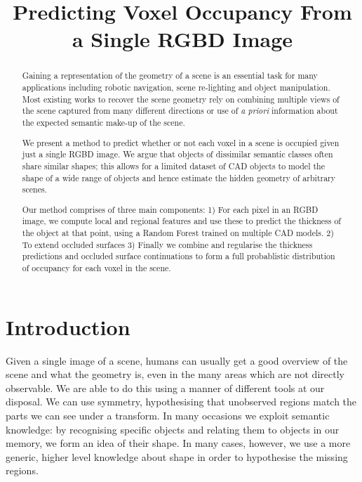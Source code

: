 \documentclass[10pt,twocolumn,letterpaper]{article}
\title{Predicting Voxel Occupancy From a Single RGBD Image}
\begin{document}
\maketitle

\begin{abstract}
	Gaining a representation of the geometry of a scene is an essential task for many applications including robotic navigation, scene re-lighting and object manipulation. 
	Most existing works to recover the scene geometry rely on combining multiple views of the scene captured from many different directions or use of \emph{a priori} information about the expected semantic make-up of the scene.

	We present a method to predict whether or not each voxel in a scene is occupied given just a single RGBD image.
	We argue that objects of dissimilar semantic classes often share similar shapes; this allows for a limited dataset of CAD objects to model the shape of a wide range of objects and hence estimate the hidden geometry of arbitrary scenes.

	Our method comprises of three main components:
	1) For each pixel in an RGBD image, we compute local and regional features and use these to predict the thickness of the object at that point, using a Random Forest trained on multiple CAD models.
	2) To extend occluded surfaces
	3) Finally we combine and regularise the thickness predictions and occluded surface continuations to form a full probablistic distribution of occupancy for each voxel in the scene.
\end{abstract}


\section{Introduction}
Given a single image of a scene, humans can usually get a good overview of the scene and what the geometry is, even in the many areas which are not directly observable. 
We are able to do this using a manner of different tools at our disposal. 
We can use symmetry, hypothesising that unobserved regions match the parts we can see under a transform.
In many occasions we exploit semantic knowledge: by recognising specific objects and relating them to objects in our memory, we form an idea of their shape.
In many cases, however, we use a more generic, higher level knowledge about shape in order to hypothesise the missing regions.
\end{document}
